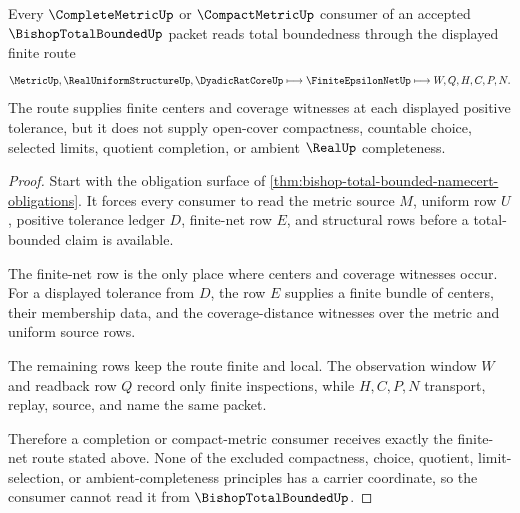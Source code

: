 \begin{theorem}
\label{thm:bishop-total-bounded-finite-net-route}
Every $\CompleteMetricUp$ or $\CompactMetricUp$ consumer of an accepted $\BishopTotalBoundedUp$ packet reads total boundedness through the displayed finite route
$$
\MetricUp,\RealUniformStructureUp,\DyadicRatCoreUp
\longmapsto
\FiniteEpsilonNetUp
\longmapsto
W,Q,H,C,P,N .
$$
The route supplies finite centers and coverage witnesses at each displayed positive tolerance, but it does not supply open-cover compactness, countable choice, selected limits, quotient completion, or ambient $\RealUp$ completeness.
\end{theorem}
\begin{proof}
Start with the obligation surface of \autoref{thm:bishop-total-bounded-namecert-obligations}. It forces every consumer to read the metric source $M$, uniform row $U$, positive tolerance ledger $D$, finite-net row $E$, and structural rows before a total-bounded claim is available.

The finite-net row is the only place where centers and coverage witnesses occur. For a displayed tolerance from $D$, the row $E$ supplies a finite bundle of centers, their membership data, and the coverage-distance witnesses over the metric and uniform source rows.

The remaining rows keep the route finite and local. The observation window $W$ and readback row $Q$ record only finite inspections, while $H,C,P,N$ transport, replay, source, and name the same packet.

Therefore a completion or compact-metric consumer receives exactly the finite-net route stated above. None of the excluded compactness, choice, quotient, limit-selection, or ambient-completeness principles has a carrier coordinate, so the consumer cannot read it from $\BishopTotalBoundedUp$.
\end{proof}




